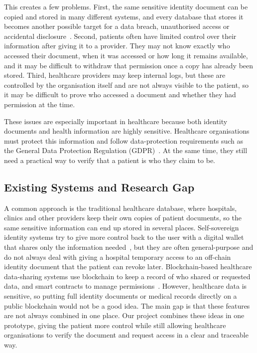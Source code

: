 \documentclass[10pt,a4paper]{article}
\begin{document}
This creates a few problems. First, the same sensitive identity document can be copied and stored in many different systems, and every database that stores it becomes another possible target for a data breach, unauthorised access or accidental disclosure~\cite{hipaa}. Second, patients often have limited control over their information after giving it to a provider. They may not know exactly who accessed their document, when it was accessed or how long it remains available, and it may be difficult to withdraw that permission once a copy has already been stored. Third, healthcare providers may keep internal logs, but these are controlled by the organisation itself and are not always visible to the patient, so it may be difficult to prove who accessed a document and whether they had permission at the time.

These issues are especially important in healthcare because both identity documents and health information are highly sensitive. Healthcare organisations must protect this information and follow data-protection requirements such as the General Data Protection Regulation (GDPR)~\cite{gdpr}. At the same time, they still need a practical way to verify that a patient is who they claim to be.

\subsection{Existing Systems and Research Gap}

A common approach is the traditional healthcare database, where hospitals, clinics and other providers keep their own copies of patient documents, so the same sensitive information can end up stored in several places. Self-sovereign identity systems try to give more control back to the user with a digital wallet that shares only the information needed~\cite{eidas,eudi,w3cvc}, but they are often general-purpose and do not always deal with giving a hospital temporary access to an off-chain identity document that the patient can revoke later. Blockchain-based healthcare data-sharing systems use blockchain to keep a record of who shared or requested data, and smart contracts to manage permissions~\cite{medrec,ancile}. However, healthcare data is sensitive, so putting full identity documents or medical records directly on a public blockchain would not be a good idea. The main gap is that these features are not always combined in one place. Our project combines these ideas in one prototype, giving the patient more control while still allowing healthcare organisations to verify the document and request access in a clear and traceable way.
\end{document}
